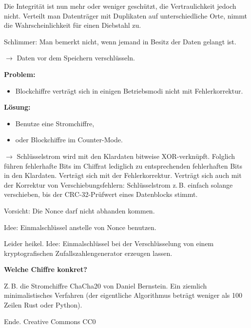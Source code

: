 \documentclass[9pt]{beamer}
\newcommand{\modest}[1]{{\small\color{gray}#1}}
\newcommand{\strong}[1]{\textsf{\textbf{#1}}}
\begin{document}
\begin{frame}
Die Integrität ist nun mehr oder weniger geschützt, die
Vertraulichkeit jedoch nicht. Verteilt man Datenträger mit Duplikaten
auf unterschiedliche Orte, nimmt die Wahrscheinlichkeit für einen
Diebstahl zu.\pause

\vspace{1em}
Schlimmer: Man bemerkt nicht, wenn jemand in Besitz der Daten
gelangt ist.\pause

\vspace{1em}
$\rightarrow$ Daten vor dem Speichern verschlüsseln.\pause

\vspace{1em}
\strong{Problem:}
\begin{itemize}
\item Blockchiffre verträgt sich in einigen Betriebsmodi
  nicht mit Fehlerkorrektur.
\end{itemize}
\end{frame}

\begin{frame}
\strong{Lösung:}
\begin{itemize}
\item Benutze eine Stromchiffre,
\item oder Blockchiffre im Counter-Mode.
\end{itemize}\pause
\vspace{1em}
$\rightarrow$ Schlüsselstrom wird mit den Klardaten bitweise
XOR-verknüpft. Folglich führen fehlerhafte Bits im Chiffrat
lediglich zu entsprechenden fehlerhaften Bits in den Klardaten.
Verträgt sich mit der Fehlerkorrektur. Verträgt sich auch mit
der Korrektur von Verschiebungsfehlern: Schlüsselstrom z.\,B. einfach
solange verschieben, bis der CRC-32-Prüfwert eines Datenblocks
stimmt.
\end{frame}

\begin{frame}
Vorsicht: Die Nonce darf nicht abhanden kommen.\pause

\vspace{1em}
Idee: Einmalschlüssel anstelle von Nonce benutzen.\pause

\vspace{1em}
Leider heikel. Idee: Einmalschlüssel bei der Verschlüsselung
von einem kryptografischen Zufallszahlengenerator erzeugen lassen.
\end{frame}

\begin{frame}
\strong{Welche Chiffre konkret?}

\vspace{1em}
Z.\,B. die Stromchiffre ChaCha20 von Daniel
Bernstein. Ein ziemlich minimalistisches Verfahren (der eigentliche
Algorithmus beträgt weniger als 100 Zeilen Rust oder Python).
\end{frame}

\begin{frame}
Ende.
\vfill\hfill
\modest{Creative Commons CC0}
\end{frame}
\end{document}
